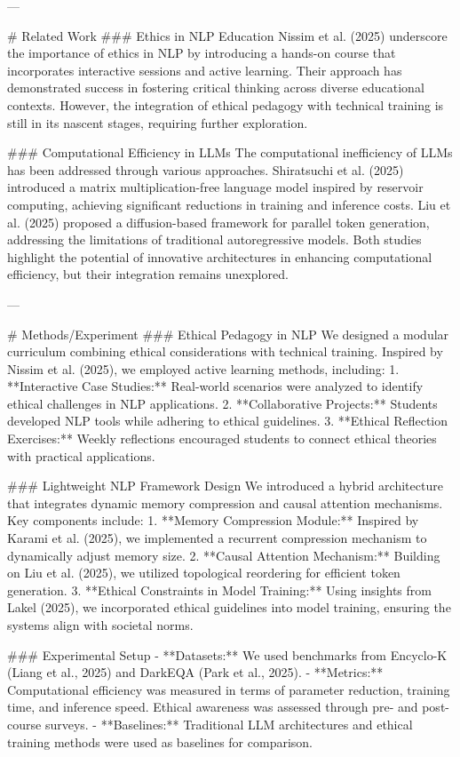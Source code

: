 ---

# Related Work  
### Ethics in NLP Education  
Nissim et al. (2025) underscore the importance of ethics in NLP by introducing a hands-on course that incorporates interactive sessions and active learning. Their approach has demonstrated success in fostering critical thinking across diverse educational contexts. However, the integration of ethical pedagogy with technical training is still in its nascent stages, requiring further exploration.

### Computational Efficiency in LLMs  
The computational inefficiency of LLMs has been addressed through various approaches. Shiratsuchi et al. (2025) introduced a matrix multiplication-free language model inspired by reservoir computing, achieving significant reductions in training and inference costs. Liu et al. (2025) proposed a diffusion-based framework for parallel token generation, addressing the limitations of traditional autoregressive models. Both studies highlight the potential of innovative architectures in enhancing computational efficiency, but their integration remains unexplored.

---

# Methods/Experiment  
### Ethical Pedagogy in NLP  
We designed a modular curriculum combining ethical considerations with technical training. Inspired by Nissim et al. (2025), we employed active learning methods, including:  
1. **Interactive Case Studies:** Real-world scenarios were analyzed to identify ethical challenges in NLP applications.  
2. **Collaborative Projects:** Students developed NLP tools while adhering to ethical guidelines.  
3. **Ethical Reflection Exercises:** Weekly reflections encouraged students to connect ethical theories with practical applications.  

### Lightweight NLP Framework Design  
We introduced a hybrid architecture that integrates dynamic memory compression and causal attention mechanisms. Key components include:  
1. **Memory Compression Module:** Inspired by Karami et al. (2025), we implemented a recurrent compression mechanism to dynamically adjust memory size.  
2. **Causal Attention Mechanism:** Building on Liu et al. (2025), we utilized topological reordering for efficient token generation.  
3. **Ethical Constraints in Model Training:** Using insights from Lakel (2025), we incorporated ethical guidelines into model training, ensuring the systems align with societal norms.

### Experimental Setup  
- **Datasets:** We used benchmarks from Encyclo-K (Liang et al., 2025) and DarkEQA (Park et al., 2025).  
- **Metrics:** Computational efficiency was measured in terms of parameter reduction, training time, and inference speed. Ethical awareness was assessed through pre- and post-course surveys.  
- **Baselines:** Traditional LLM architectures and ethical training methods were used as baselines for comparison.  


